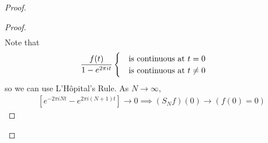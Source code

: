 \begin{proof}
\begin{proof}
\begin{align}
        \end{align}
        Note that
        \begin{align}
            \dfrac{f(t)}{1-e^{2\pi it}} \begin{cases}
                \qq{is continuous at $t=0$}\\
                \qq{is continuous at $t\ne0$}
            \end{cases}
        \end{align}
        so we can use L'Hôpital's Rule. As $N \to \infty$,
        \begin{align}
            \left[ e^{-2\pi iNt} - e^{2\pi i(N+1)t} \right] \to 0 \implies (S_Nf)(0) \to (f(0) = 0)
        \end{align}
    \end{proof}
\end{proof}